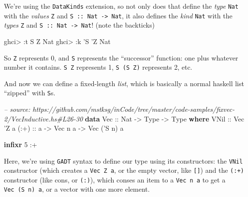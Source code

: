\documentclass[]{article}
\newenvironment{Shaded}{}{}
\newcommand{\KeywordTok}[1]{\textcolor[rgb]{0.00,0.44,0.13}{\textbf{#1}}}
\newcommand{\DataTypeTok}[1]{\textcolor[rgb]{0.56,0.13,0.00}{#1}}
\newcommand{\DecValTok}[1]{\textcolor[rgb]{0.25,0.63,0.44}{#1}}
\newcommand{\CharTok}[1]{\textcolor[rgb]{0.25,0.44,0.63}{#1}}
\newcommand{\CommentTok}[1]{\textcolor[rgb]{0.38,0.63,0.69}{\textit{#1}}}
\newcommand{\OtherTok}[1]{\textcolor[rgb]{0.00,0.44,0.13}{#1}}
\newcommand{\FunctionTok}[1]{\textcolor[rgb]{0.02,0.16,0.49}{#1}}
\newcommand{\NormalTok}[1]{#1}
\begin{document}
We're using the \texttt{DataKinds} extension, so not only does that define the
\emph{type} \texttt{Nat} with the \emph{values} \texttt{Z} and
\texttt{S\ ::\ Nat\ -\textgreater{}\ Nat}, it also defines the \emph{kind}
\texttt{Nat} with the \emph{types} \texttt{\textquotesingle{}Z} and
\texttt{\textquotesingle{}S\ ::\ Nat\ -\textgreater{}\ Nat}! (note the
backticks)

\begin{Shaded}
\begin{Highlighting}[]
\NormalTok{ghci}\FunctionTok{>} \FunctionTok{:}\NormalTok{t }\DataTypeTok{S} \DataTypeTok{Z}
\DataTypeTok{Nat}
\NormalTok{ghci}\FunctionTok{>} \FunctionTok{:}\NormalTok{k }\CharTok{'S '}\DataTypeTok{Z}
\DataTypeTok{Nat}
\end{Highlighting}
\end{Shaded}

So \texttt{\textquotesingle{}Z} represents 0, and \texttt{\textquotesingle{}S}
represents the ``successor'' function: one plus whatever number it contains.
\texttt{\textquotesingle{}S\ \textquotesingle{}Z} represents 1,
\texttt{\textquotesingle{}S\ (\textquotesingle{}S\ \textquotesingle{}Z)}
represents 2, etc.

And now we can define a fixed-length \emph{list}, which is basically a normal
haskell list ``zipped'' with \texttt{S}s.

\begin{Shaded}
\begin{Highlighting}[]
\CommentTok{-- source: https://github.com/mstksg/inCode/tree/master/code-samples/fixvec-2/VecInductive.hs#L26-30}
\KeywordTok{data} \DataTypeTok{Vec}\OtherTok{ ::} \DataTypeTok{Nat} \OtherTok{->} \DataTypeTok{Type} \OtherTok{->} \DataTypeTok{Type} \KeywordTok{where}
    \DataTypeTok{VNil}\OtherTok{ ::} \DataTypeTok{Vec} \CharTok{'Z a}
\OtherTok{    (:+) ::}\NormalTok{ a }\OtherTok{->} \DataTypeTok{Vec}\NormalTok{ n a }\OtherTok{->} \DataTypeTok{Vec}\NormalTok{ (}\CharTok{'S n) a}

\KeywordTok{infixr} \DecValTok{5} \FunctionTok{:+}
\end{Highlighting}
\end{Shaded}

Here, we're using \texttt{GADT} syntax to define our type using its
constructors: the \texttt{VNil} constructor (which creates a
\texttt{Vec\ \textquotesingle{}Z\ a}, or the empty vector, like \texttt{{[}{]}})
and the \texttt{(:+)} constructor (like cons, or \texttt{(:)}), which conses an
item to a \texttt{Vec\ n\ a} to get a \texttt{Vec\ (\textquotesingle{}S\ n)\ a},
or a vector with one more element.
\end{document}
